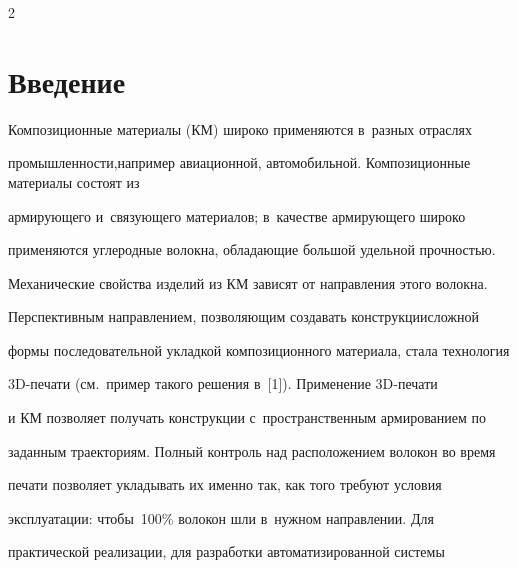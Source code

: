 




\thispagestyle{headings}





\begin{multicols}{2}





\label{st\stat}





\section{Введение}





  Композиционные материалы (КМ) широко применяются в~разных отраслях 


про\-мыш\-лен\-ности,\linebreak например авиационной, автомобильной. Композиционные материалы состоят из 


ар\-ми\-ру\-юще\-го и~свя\-зу\-юще\-го материалов; в~качестве ар\-ми\-ру\-юще\-го широко 


применяются углеродные волокна, \mbox{об\-ла\-да\-ющие} большой удельной проч\-ностью. 


Механические свойства изделий из КМ зависят от на\-прав\-ле\-ния этого волокна. 


Перспективным на\-прав\-ле\-нием, поз\-во\-ля\-ющим создавать конструкции\linebreak слож\-ной 


формы последовательной укладкой композиционного материала, стала технология  


3D-пе\-ча\-ти (см.\ пример такого решения в~[1]). Применение 3D-пе\-ча\-ти 


и КМ позволяет получать \mbox{конструкции} с~пространственным армированием по 


заданным траекториям. Пол\-ный контроль над расположением волокон во время 


печати позволяет укладывать их именно так, как того требуют условия 


эксплуатации: чтобы~100\% волокон шли в~нужном направлении. Для 


практической реализации, для разработки автоматизированной сис\-те\-мы 



\end{multicols}
